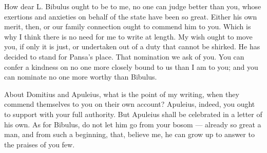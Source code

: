 

 How dear L. Bibulus ought to be to me, no one can judge better than you, whose exertions and anxieties on behalf of the state have been so great. Either his own merit, then, or our family connection ought to commend him to you. Which is why I think there is no need for me to write at length. My wish ought to move you, if only it is just, or undertaken out of a duty that cannot be shirked. He has decided to stand for Pansa's place. That nomination we ask of you. You can confer a kindness on no one more closely bound to us than I am to you; and you can nominate no one more worthy than Bibulus.

 About Domitius and Apuleius, what is the point of my writing, when they commend themselves to you on their own account? Apuleius, indeed, you ought to support with your full authority. But Apuleius shall be celebrated in a letter of his own. As for Bibulus, do not let him go from your bosom --- already so great a man, and from such a beginning, that, believe me, he can grow up to answer to the praises of you few.
